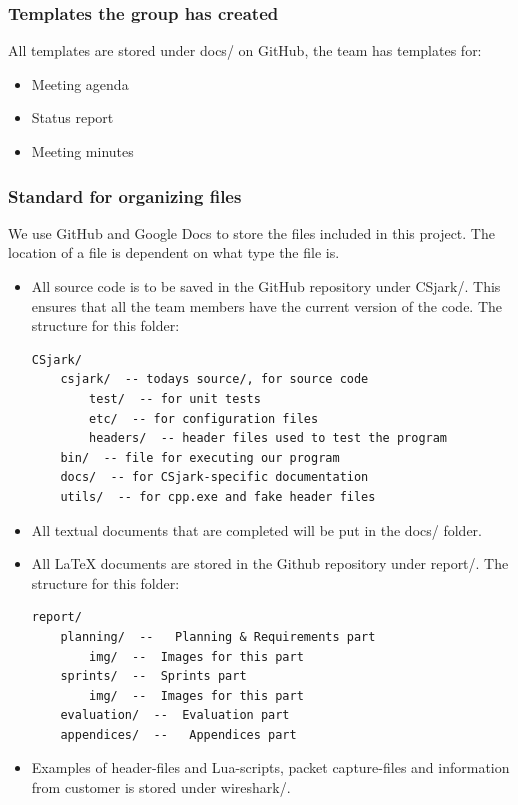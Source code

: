 \subsubsection{Templates the group has created}
All templates are stored under docs/ on GitHub, the team has templates for:

\begin{itemize}
	\item Meeting agenda
	\item Status report
	\item Meeting minutes
\end{itemize}

\subsubsection{Standard for organizing files}
We use GitHub and Google Docs to store the files included in this project. The
location of a file is dependent on what type the file is. 

\begin{itemize}
	\item All source code is to be saved in the GitHub repository under
		CSjark/. This ensures that all the team members have the current
		version of the code. The structure for this folder:
		\begin{verbatim}
CSjark/
    csjark/  -- todays source/, for source code
        test/  -- for unit tests
        etc/  -- for configuration files
        headers/  -- header files used to test the program
    bin/  -- file for executing our program
    docs/  -- for CSjark-specific documentation
    utils/  -- for cpp.exe and fake header files
		\end{verbatim}
	\item All textual documents that are completed will be put in the
		docs/ folder.
	\item All LaTeX documents are stored in the Github repository
		under report/. The structure for this folder:
		\begin{verbatim}
report/
    planning/  --   Planning & Requirements part
        img/  --  Images for this part
    sprints/  --  Sprints part
        img/  --  Images for this part
    evaluation/  --  Evaluation part
    appendices/  --   Appendices part
		\end{verbatim}
	\item Examples of header-files and Lua-scripts, packet capture-files and information from customer is stored under wireshark/.
\end{itemize}

